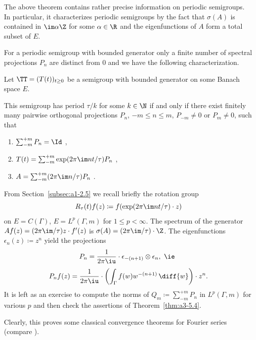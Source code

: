 The above theorem contains rather precise information on periodic semigroups.
In particular, it characterizes periodic semigroups by the fact that $\sigma(A)$ is contained in $\im\alpha\Z$ for some $\alpha \in \R$ and the eigenfunctions of\/ $A$ form a total subset of\/ $E$.

For a periodic semigroup with bounded generator
only a finite number of spectral projections $P_{n}$ are distinct from $0$ and we have the following characterization.
\begin{corollary}\label{cor:a3-5.5}
Let $\TT = (T(t))_{t \geq 0}$ be a semigroup with bounded generator on some Banach space $E$.

This semigroup has period $\tau/k$ for some $k \in \N$ if and only if there exist finitely many pairwise orthogonal projections $P_{n}$, $-m \leq n \leq m$, $P_{-m} \neq 0$ or $P_{m} \neq 0$, such that
\begin{enumerate}[\upshape (i)]
\item 
$\sum_{-m}^{+m} P_{n} =  \Id$ ,

\item 
$T(t) = \sum_{-m}^{+m} \exp(2\pi\im nt/\tau)P_{n}$ ,

\item 
$A = \sum_{-m}^{+m} (2\pi\im n/\tau)P_{n}$ .

\end{enumerate}
\end{corollary}
\begin{example}\label{ex:a3-5.6} 
From Section~\ref{subsec:a1-2.5} we recall briefly the rotation group
\[
R_{\tau}(t)f(z) \coloneqq f(\exp(2\pi\im nt/\tau) \cdot z)
\]
on $E = C(\Gamma)$, \resp $E = L^{p}(\Gamma,m)$ for $1 \leq p < \infty$.
The spectrum of the generator\quad
$Af(z) = (2\pi\im /\tau)z \cdot f'(z)$\quad
is \quad $\sigma(A) = (2\pi\im /\tau) \cdot\Z$.
The eigenfunctions $\epsilon_{n}(z) \coloneqq z^{n}$ yield the projections
\[
P_{n} = \frac{1}{2\pi \iu} \cdot\epsilon_{-(n+1)} \otimes \epsilon_{n}, \text{ \ie }
\]
\[
P_{n}f(z) = \frac{1}{2\pi \iu}  \cdot \left( \int_{\Gamma} f(w)w^{-(n+1)} \, \diff{w} \right)\cdot z^{n} .
\]
It is left as an exercise to compute the norms of\/ $Q_{m} \coloneqq \sum_{-m}^{+m} P_{n}$ in $L^{p}(\Gamma,m)$ for various $p$ and then check the assertions of Theorem~\ref{thm:a3-5.4}.

Clearly, this proves some classical convergence theorems for Fourier series (compare \textcite[Chap.8.1]{davies:1980}).
\end{example}


